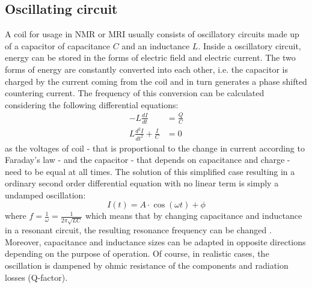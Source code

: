             \subsection{Oscillating circuit}
                A coil for usage in NMR or MRI usually consists of oscillatory circuits made up of a capacitor of capacitance $C$ and an inductance $L$. Inside a oscillatory circuit, energy can be stored in the forms of electric field and electric current. The two forms of energy are constantly converted into each other, i.e. the capacitor is charged by the current coming from the coil and in turn generates a phase shifted countering current. The frequency of this conversion can be calculated considering the following differential equations:
                \begin{equation}
                    \begin{aligned}
                        -L\frac{dI}{dt} &= \frac{Q}{C} \\
                        L\frac{d^2I}{dt^2} + \frac{I}{C} &= 0
                    \end{aligned}
                \end{equation}
                as the voltages of coil - that is proportional to the change in current according to Faraday's law - and the capacitor - that depends on capacitance and charge - need to be equal at all times. The solution of this simplified case resulting in a ordinary second order differential equation with no linear term is simply a undamped oscillation:
                \begin{equation}
                    I(t) =  A \cdot \cos(\omega t) + \phi 
                \end{equation}
                where $f= \frac{1}{\omega} = \frac{1}{2\pi\sqrt{LC}}$ which means that by changing capacitance and inductance in a resonant circuit, the resulting resonance frequency can be changed \cite{rao_electronic_2011}. Moreover, capacitance and inductance sizes can be adapted in opposite directions depending on the purpose of operation.
                Of course, in realistic cases, the oscillation is dampened by ohmic resistance of the components and radiation losses (Q-factor).
